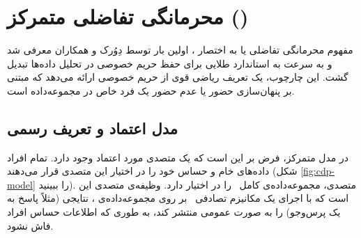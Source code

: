 \section{محرمانگی تفاضلی متمرکز ()}
\label{sec:bg:cdp}

مفهوم محرمانگی تفاضلی یا به اختصار ، اولین بار توسط دِوُرک و همکاران \cite{dwork2006differential} معرفی شد و به سرعت به استاندارد طلایی برای حفظ حریم خصوصی در تحلیل داده‌ها تبدیل گشت. این چارچوب، یک تعریف ریاضی قوی از حریم خصوصی ارائه می‌دهد که مبتنی بر پنهان‌سازی حضور یا عدم حضور یک فرد خاص در مجموعه‌داده است.

\subsection{مدل اعتماد و تعریف رسمی}
\label{sec:bg:cdp-def}

در مدل متمرکز، فرض بر این است که یک متصدی مورد اعتماد وجود دارد. تمام افراد داده‌های خام و حساس خود را در اختیار این متصدی قرار می‌دهند (شکل \ref{fig:cdp-model} را ببینید). متصدی، مجموعه‌داده‌ی کامل \Dset \ را در اختیار دارد. وظیفه‌ی متصدی این است که با اجرای یک مکانیزم تصادفی \mech \ بر روی مجموعه‌داده‌ی \Dset، نتایجی (مثلاً پاسخ به یک پرس‌وجو) را به صورت عمومی منتشر کند، به طوری که اطلاعات حساس افراد فاش نشود.

